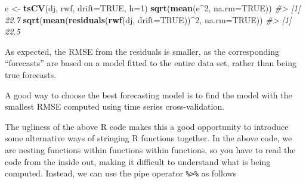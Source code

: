 \documentclass[]{book}
\newenvironment{Shaded}{\begin{snugshade}}{\end{snugshade}}
\newcommand{\CommentTok}[1]{\textcolor[rgb]{0.56,0.35,0.01}{\textit{#1}}}
\newcommand{\DataTypeTok}[1]{\textcolor[rgb]{0.13,0.29,0.53}{#1}}
\newcommand{\DecValTok}[1]{\textcolor[rgb]{0.00,0.00,0.81}{#1}}
\newcommand{\KeywordTok}[1]{\textcolor[rgb]{0.13,0.29,0.53}{\textbf{#1}}}
\newcommand{\NormalTok}[1]{#1}
\newcommand{\OperatorTok}[1]{\textcolor[rgb]{0.81,0.36,0.00}{\textbf{#1}}}
\newcommand{\OtherTok}[1]{\textcolor[rgb]{0.56,0.35,0.01}{#1}}
\newcommand{\StringTok}[1]{\textcolor[rgb]{0.31,0.60,0.02}{#1}}
\begin{document}
\begin{Shaded}
\begin{Highlighting}[]
\NormalTok{e <-}\StringTok{ }\KeywordTok{tsCV}\NormalTok{(dj, rwf, }\DataTypeTok{drift=}\OtherTok{TRUE}\NormalTok{, }\DataTypeTok{h=}\DecValTok{1}\NormalTok{)}
\KeywordTok{sqrt}\NormalTok{(}\KeywordTok{mean}\NormalTok{(e}\OperatorTok{^}\DecValTok{2}\NormalTok{, }\DataTypeTok{na.rm=}\OtherTok{TRUE}\NormalTok{))}
\CommentTok{#> [1] 22.7}
\KeywordTok{sqrt}\NormalTok{(}\KeywordTok{mean}\NormalTok{(}\KeywordTok{residuals}\NormalTok{(}\KeywordTok{rwf}\NormalTok{(dj, }\DataTypeTok{drift=}\OtherTok{TRUE}\NormalTok{))}\OperatorTok{^}\DecValTok{2}\NormalTok{, }\DataTypeTok{na.rm=}\OtherTok{TRUE}\NormalTok{))}
\CommentTok{#> [1] 22.5}
\end{Highlighting}
\end{Shaded}

As expected, the RMSE from the residuals is smaller, as the corresponding ``forecasts'' are based on a model fitted to the entire data set, rather than being true forecasts.

A good way to choose the best forecasting model is to find the model with the smallest RMSE computed using time series cross-validation.

The ugliness of the above R code makes this a good opportunity to introduce some alternative ways of stringing R functions together. In the above code, we are nesting functions within functions within functions, so you have to read the code from the inside out, making it difficult to understand what is being computed. Instead, we can use the pipe operator \texttt{\%\textgreater{}\%} as follows

\begin{Shaded}
\end{Shaded}
\end{document}
